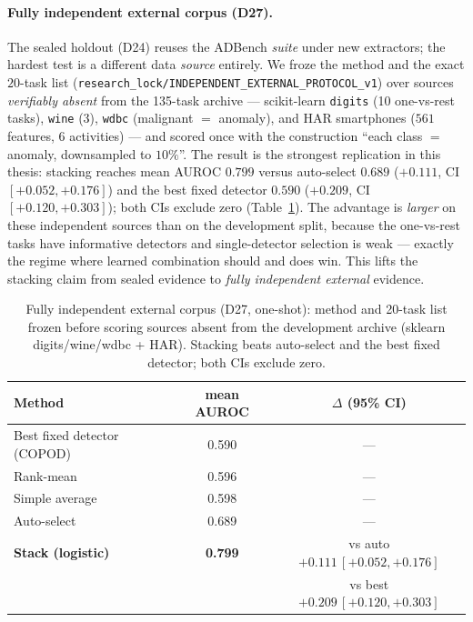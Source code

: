 \documentclass[11pt,titlepage]{article}
\begin{document}
\paragraph{Fully independent external corpus (D27).}
The sealed holdout (D24) reuses the ADBench \emph{suite} under new extractors; the
hardest test is a different data \emph{source} entirely. We froze the method and the
exact $20$-task list (\texttt{research\_lock/INDEPENDENT\_EXTERNAL\_PROTOCOL\_v1})
over sources \emph{verifiably absent} from the 135-task archive --- scikit-learn
\texttt{digits} (10 one-vs-rest tasks), \texttt{wine} (3), \texttt{wdbc}
(malignant $=$ anomaly), and HAR smartphones ($561$ features, 6 activities) --- and
scored once with the construction ``each class $=$ anomaly, downsampled to $10\%$''.
The result is the strongest replication in this thesis: stacking reaches mean AUROC
$0.799$ versus auto-select $0.689$ ($+0.111$, CI $[+0.052,+0.176]$) and the best
fixed detector $0.590$ ($+0.209$, CI $[+0.120,+0.303]$); both CIs exclude zero
(Table~\ref{tab:indep_th}). The advantage is \emph{larger} on these independent
sources than on the development split, because the one-vs-rest tasks have informative
detectors and single-detector selection is weak --- exactly the regime where learned
combination should and does win. This lifts the stacking claim from sealed evidence
to \emph{fully independent external} evidence.

\begin{table}[H]\centering
\caption{Fully independent external corpus (D27, one-shot): method and 20-task list
frozen before scoring sources absent from the development archive (sklearn
digits/wine/wdbc + HAR). Stacking beats auto-select and the best fixed detector; both
CIs exclude zero.}
\label{tab:indep_th}\small
\begin{tabular}{lcc}
\toprule
\textbf{Method} & mean AUROC & $\Delta$ (95\% CI) \\
\midrule
Best fixed detector (COPOD) & 0.590 & --- \\
Rank-mean & 0.596 & --- \\
Simple average & 0.598 & --- \\
Auto-select & 0.689 & --- \\
\textbf{Stack (logistic)} & \textbf{0.799} & vs auto $+0.111\,[+0.052,+0.176]$ \\
 & & vs best $+0.209\,[+0.120,+0.303]$ \\
\bottomrule
\end{tabular}
\end{table}
\end{document}
